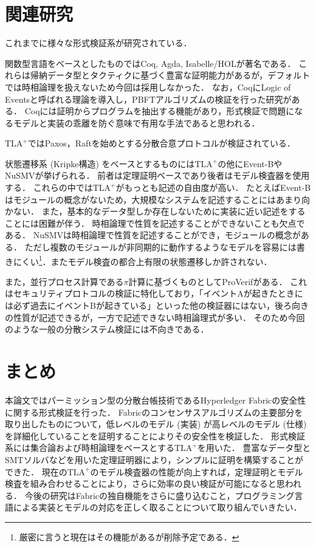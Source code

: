 \documentclass{fose2019}           %
\newcommand{\TLA}{$\text{TLA}^{+}$}
\begin{document}
\section{関連研究}
\label{sec:related}

これまでに様々な形式検証系が研究されている．

関数型言語をベースとしたものではCoq, Agda, Isabelle/HOLが著名である．
これらは帰納データ型とタクティクに基づく豊富な証明能力があるが，デフォルトでは時相論理を扱えないため今回は採用しなかった．
なお，CoqにLogic of Eventsと呼ばれる理論を導入し，PBFTアルゴリズムの検証を行った研究がある\cite{loe}．
Coqには証明からプログラムを抽出する機能があり，形式検証で問題になるモデルと実装の乖離を防ぐ意味で有用な手法であると思われる．

\TLA ではPaxos，Raftを始めとする分散合意プロトコルが検証されている．

状態遷移系 (Kripke構造) をベースとするものには\TLA の他にEvent-BやNuSMVが挙げられる．
前者は定理証明ベースであり後者はモデル検査器を使用する．
これらの中では\TLA がもっとも記述の自由度が高い．
たとえばEvent-Bはモジュールの概念がないため，大規模なシステムを記述することにはあまり向かない．
また，基本的なデータ型しか存在しないために実装に近い記述をすることには困難が伴う．
時相論理で性質を記述することができないことも欠点である．
NuSMVは時相論理で性質を記述することができ，モジュールの概念がある．
ただし複数のモジュールが非同期的に動作するようなモデルを容易には書きにくい\footnote{厳密に言うと現在はその機能があるが削除予定である．}．またモデル検査の都合上有限の状態遷移しか許されない．

また，並行プロセス計算である$\pi$計算に基づくものとしてProVerifがある．
これはセキュリティプロトコルの検証に特化しており，「イベントAが起きたときには必ず過去にイベントBが起きている」といった他の検証器にはない，後ろ向きの性質が記述できるが，一方で記述できない時相論理式が多い．
そのため今回のような一般の分散システム検証には不向きである．

\section{まとめ}
本論文ではパーミッション型の分散台帳技術であるHyperledger Fabricの安全性に関する形式検証を行った．
Fabricのコンセンサスアルゴリズムの主要部分を取り出したものについて，低レベルのモデル (実装) が高レベルのモデル (仕様) を詳細化していることを証明することによりその安全性を検証した．
形式検証系には集合論および時相論理をベースとする\TLA を用いた．
豊富なデータ型とSMTソルバなどを用いた定理証明器により，シンプルに証明を構築することができた．
現在の\TLA のモデル検査器の性能が向上すれば，定理証明とモデル検査を組み合わせることにより，さらに効率の良い検証が可能になると思われる．
今後の研究はFabricの独自機能をさらに盛り込むこと，プログラミング言語による実装とモデルの対応を正しく取ることについて取り組んでいきたい．
\end{document}
